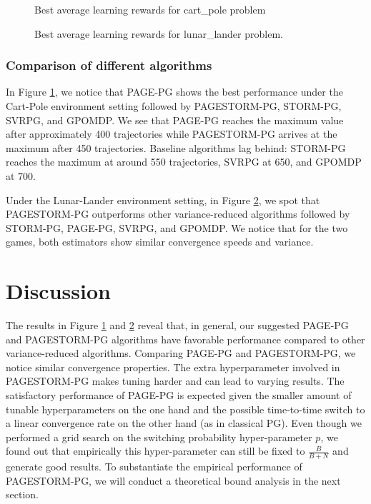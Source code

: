\documentclass[10pt,twocolumn,letterpaper]{article}
\begin{document}
\begin{figure}[h!]
  
  \caption{Best average learning rewards for cart\_pole problem }
  \label{fig:cart_pole}
\end{figure}

\begin{figure}[h!]
  
  \caption{Best average learning rewards for lunar\_lander problem.  }
  \label{fig:lunar_lander}
\end{figure}

\subsubsection*{Comparison of different algorithms}
In Figure \ref{fig:cart_pole}, we notice that PAGE-PG shows the best performance under the Cart-Pole environment setting followed by  PAGESTORM-PG, STORM-PG, SVRPG, and GPOMDP. We see that PAGE-PG reaches the maximum value after approximately 400 trajectories while PAGESTORM-PG arrives at the maximum after 450 trajectories. Baseline algorithms lag behind: STORM-PG reaches the maximum at around 550 trajectories, SVRPG at 650, and GPOMDP at 700.

Under the Lunar-Lander environment setting, in Figure \ref{fig:lunar_lander}, we spot that PAGESTORM-PG outperforms other variance-reduced algorithms followed by STORM-PG, PAGE-PG, SVRPG, and GPOMDP. We notice that for the two games, both estimators show similar convergence speeds and variance. 



\section{Discussion} \label{discussion}

The results in Figure \ref{fig:cart_pole} and \ref{fig:lunar_lander} reveal that, in general, our suggested PAGE-PG and PAGESTORM-PG algorithms have favorable performance compared to other variance-reduced algorithms. Comparing PAGE-PG and PAGESTORM-PG, we notice similar convergence properties. The extra hyperparameter involved in  PAGESTORM-PG makes tuning harder and can lead to varying results. The satisfactory performance of PAGE-PG is expected given the smaller amount of tunable hyperparameters on the one hand and the possible time-to-time switch to a linear convergence rate on the other hand (as in classical PG). Even though we performed a grid search on the switching probability hyper-parameter $p$, we found out that empirically this hyper-parameter can still be fixed to $\frac{B}{B+N}$ and generate good results. To substantiate the empirical performance of PAGESTORM-PG, we will conduct a theoretical bound analysis in the next section.
\end{document}
